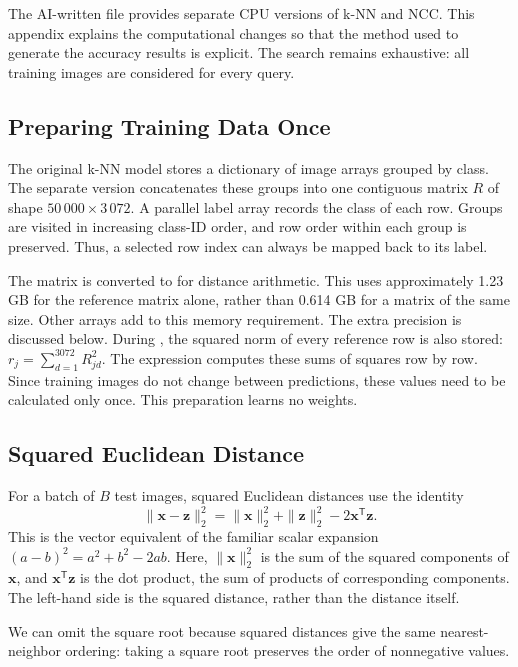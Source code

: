 The AI-written file  provides separate CPU versions
of k-NN and NCC. This appendix explains the computational changes so that
the method used to generate the accuracy results is explicit. The search
remains exhaustive: all training images are considered for every query.

\subsection{Preparing Training Data Once}
The original k-NN model stores a dictionary of image arrays grouped by class.
The separate version concatenates these groups into one contiguous matrix
$R$ of shape $50\,000\times3\,072$. A parallel label array records the class
of each row. Groups are visited in increasing class-ID order, and row order
within each group is preserved. Thus, a selected row index can always be
mapped back to its label.

The matrix is converted to  for distance arithmetic. This
uses approximately 1.23 GB for the reference matrix alone, rather than
0.614 GB for a  matrix of the same size. Other arrays add to
this memory requirement. The extra precision is discussed below. During
, the squared norm of every reference row is also stored:
$r_j=\sum_{d=1}^{3072}R_{jd}^2$. The expression
 computes these sums of squares row by row.
Since training images do not change between predictions, these values
need to be calculated only once. This preparation learns no weights.

\subsection{Squared Euclidean Distance}

For a batch of $B$ test images, squared Euclidean distances use the identity
\begin{equation}
\|\mathbf{x}-\mathbf{z}\|_2^2=
\|\mathbf{x}\|_2^2+\|\mathbf{z}\|_2^2-2\mathbf{x}^{\mathsf T}\mathbf{z}.
\label{eq:fastdistance}
\end{equation}
This is the vector equivalent of the familiar scalar expansion
$(a-b)^2=a^2+b^2-2ab$. Here, $\|\mathbf{x}\|_2^2$ is the sum of the
squared components of $\mathbf{x}$, and $\mathbf{x}^{\mathsf T}\mathbf{z}$
is the dot product, the sum of products of corresponding components.
The left-hand side is the squared distance, rather than the distance itself.

We can omit the square root because squared distances give the same
nearest-neighbor ordering: taking a square root preserves the order of
nonnegative values.

